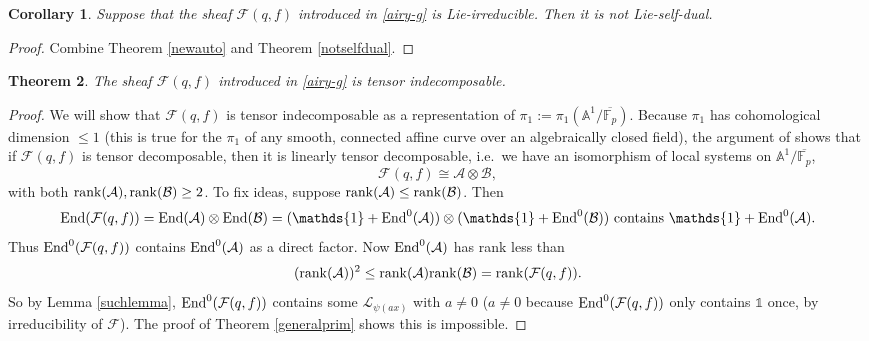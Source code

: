 \documentclass[11pt]{amsart}
\theoremstyle{plain}
\newtheorem{thm}{Theorem}
\newtheorem{cor}[thm]{Corollary}
\theoremstyle{definition}
\numberwithin{thm}{section}
\numberwithin{equation}{thm}
\newcommand{\rank}{{\rm rank}}
\newcommand{\End}{{\rm End}}
\newcommand{\sA}{{\mathcal A}}
\newcommand{\sB}{{\mathcal B}}
\newcommand{\sF}{{\mathcal F}}
\newcommand{\sG}{{\mathcal G}}
\newcommand{\sL}{{\mathcal L}}
\newcommand{\A}{{\mathbb A}}
\newcommand{\F}{{\mathbb F}}
\newcommand{\G}{{\mathbb G}}
\newcommand{\0}{\emptyset}
\newcommand{\triv}{{\mathds{1}}}
\begin{document}
\begin{cor}\label{cor:sd}
Suppose that the sheaf $\sF(q,f)$ introduced in \eqref{airy-g} is Lie-irreducible. Then it is not Lie-self-dual.
\end{cor}
\begin{proof}Combine Theorem \ref{newauto} and Theorem \ref{notselfdual}.
\end{proof}

\begin{thm}\label{Airytensorindec}
The sheaf $\sF(q,f)$ introduced in \eqref{airy-g} is tensor indecomposable.
\end{thm}

\begin{proof}We will show that $\sF(q,f)$ is tensor indecomposable as a representation of $\pi_1:=\pi_1(\A^1/\overline{\F_p})$. Because $\pi_1$ has cohomological dimension $\le 1$ (this is true for the $\pi_1$ of any smooth, connected affine curve over an algebraically closed field), the argument of \cite[Corollary 10.4]{Ka-RL-T-2Co1} shows that if $\sF(q,f)$ is tensor decomposable, then it is linearly tensor decomposable, i.e.\ we have an isomorphism of local systems on $\A^1/\overline{\F_p}$,
$$\sF(q,f) \cong \sA \otimes \sB,$$
with both $\rank(\sA), \rank(\sB) \ge 2$. To fix ideas, suppose  $\rank(\sA) \le \rank(\sB)$. Then
$$\End(\sF(q,f) ) =\End(\sA)\otimes \End(\sB)= (\triv + \End^0(\sA))\otimes  (\triv + \End^0(\sB)) {\rm \  contains \ }  \triv + \End^0(\sA).$$
Thus $\End^0(\sF(q,f))$ contains $ \End^0(\sA)$ as a direct factor. Now $ \End^0(\sA)$ has rank less than 
$$(\rank(\sA))^2 \le \rank(\sA)\rank(\sB)=\rank(\sF(q,f)).$$ 
So by Lemma \ref{suchlemma}, $\End^0(\sF(q,f))$ contains some $\sL_{\psi(ax)}$ with $a \neq 0$ ($a \neq 0$ 
because  $\End^0(\sF(q,f))$ only contains $\triv$ once, by irreducibility of $\sF$). The proof of Theorem \ref{generalprim} shows this is impossible.
\end{proof}
  
\end{document}
